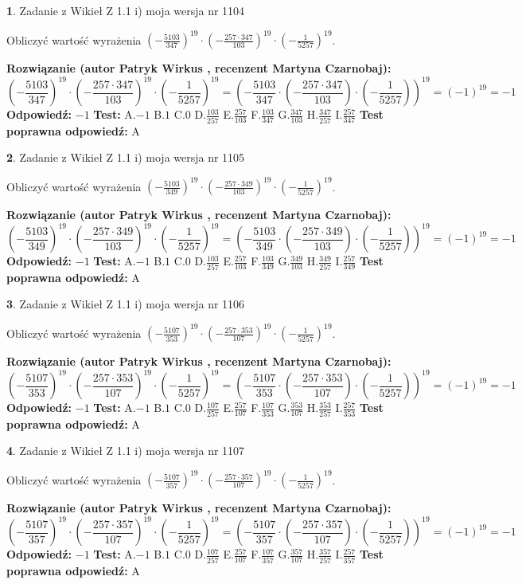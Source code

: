 \documentclass[12pt, a4paper]{article}
\theoremstyle{definition} %
\newtheorem{zad}{}
\newcommand{\zadStart}[1]{\begin{zad}#1\newline}
\newcommand{\zadStop}{\end{zad}}
\newcommand{\rozwStart}[2]{\noindent \textbf{Rozwiązanie (autor #1 , recenzent #2): }\newline}
\newcommand{\rozwStop}{\newline}
\newcommand{\odpStart}{\noindent \textbf{Odpowiedź:}\newline}
\newcommand{\odpStop}{\newline}
\newcommand{\testStart}{\noindent \textbf{Test:}\newline}
\newcommand{\testStop}{\newline}
\newcommand{\kluczStart}{\noindent \textbf{Test poprawna odpowiedź:}\newline}
\newcommand{\kluczStop}{\newline}
\begin{document}
\zadStart{Zadanie z Wikieł Z 1.1 i) moja wersja nr 1104}

Obliczyć wartość wyrażenia $(-\frac{5103}{347})^{19} \cdot (-\frac{257 \cdot 347}{103})^{19} \cdot (-\frac{1}{5257})^{19}$.
\zadStop
\rozwStart{Patryk Wirkus}{Martyna Czarnobaj}
$$(-\frac{5103}{347})^{19} \cdot (-\frac{257 \cdot 347}{103})^{19} \cdot (-\frac{1}{5257})^{19} = (-\frac{5103}{347} \cdot (-\frac{257 \cdot 347}{103}) \cdot (-\frac{1}{5257}))^{19} = (-1)^{19} = -1$$
\rozwStop
\odpStart
$-1$
\odpStop
\testStart
A.$-1$ B.$1$ C.$0$ D.$\frac{103}{257}$ E.$\frac{257}{103}$
F.$\frac{103}{347}$ G.$\frac{347}{103}$
H.$\frac{347}{257}$
I.$\frac{257}{347}$
\testStop
\kluczStart
A
\kluczStop



\zadStart{Zadanie z Wikieł Z 1.1 i) moja wersja nr 1105}

Obliczyć wartość wyrażenia $(-\frac{5103}{349})^{19} \cdot (-\frac{257 \cdot 349}{103})^{19} \cdot (-\frac{1}{5257})^{19}$.
\zadStop
\rozwStart{Patryk Wirkus}{Martyna Czarnobaj}
$$(-\frac{5103}{349})^{19} \cdot (-\frac{257 \cdot 349}{103})^{19} \cdot (-\frac{1}{5257})^{19} = (-\frac{5103}{349} \cdot (-\frac{257 \cdot 349}{103}) \cdot (-\frac{1}{5257}))^{19} = (-1)^{19} = -1$$
\rozwStop
\odpStart
$-1$
\odpStop
\testStart
A.$-1$ B.$1$ C.$0$ D.$\frac{103}{257}$ E.$\frac{257}{103}$
F.$\frac{103}{349}$ G.$\frac{349}{103}$
H.$\frac{349}{257}$
I.$\frac{257}{349}$
\testStop
\kluczStart
A
\kluczStop



\zadStart{Zadanie z Wikieł Z 1.1 i) moja wersja nr 1106}

Obliczyć wartość wyrażenia $(-\frac{5107}{353})^{19} \cdot (-\frac{257 \cdot 353}{107})^{19} \cdot (-\frac{1}{5257})^{19}$.
\zadStop
\rozwStart{Patryk Wirkus}{Martyna Czarnobaj}
$$(-\frac{5107}{353})^{19} \cdot (-\frac{257 \cdot 353}{107})^{19} \cdot (-\frac{1}{5257})^{19} = (-\frac{5107}{353} \cdot (-\frac{257 \cdot 353}{107}) \cdot (-\frac{1}{5257}))^{19} = (-1)^{19} = -1$$
\rozwStop
\odpStart
$-1$
\odpStop
\testStart
A.$-1$ B.$1$ C.$0$ D.$\frac{107}{257}$ E.$\frac{257}{107}$
F.$\frac{107}{353}$ G.$\frac{353}{107}$
H.$\frac{353}{257}$
I.$\frac{257}{353}$
\testStop
\kluczStart
A
\kluczStop



\zadStart{Zadanie z Wikieł Z 1.1 i) moja wersja nr 1107}

Obliczyć wartość wyrażenia $(-\frac{5107}{357})^{19} \cdot (-\frac{257 \cdot 357}{107})^{19} \cdot (-\frac{1}{5257})^{19}$.
\zadStop
\rozwStart{Patryk Wirkus}{Martyna Czarnobaj}
$$(-\frac{5107}{357})^{19} \cdot (-\frac{257 \cdot 357}{107})^{19} \cdot (-\frac{1}{5257})^{19} = (-\frac{5107}{357} \cdot (-\frac{257 \cdot 357}{107}) \cdot (-\frac{1}{5257}))^{19} = (-1)^{19} = -1$$
\rozwStop
\odpStart
$-1$
\odpStop
\testStart
A.$-1$ B.$1$ C.$0$ D.$\frac{107}{257}$ E.$\frac{257}{107}$
F.$\frac{107}{357}$ G.$\frac{357}{107}$
H.$\frac{357}{257}$
I.$\frac{257}{357}$
\testStop
\kluczStart
A
\kluczStop
\end{document}
